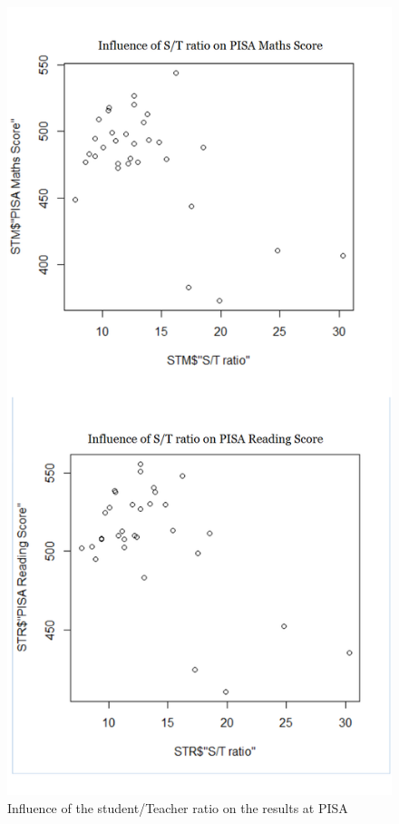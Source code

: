 \documentclass[12pt,a4paper]{article}
\begin{document}
\begin{figure}
	\centering
	\label{STRatio}
	\caption{Influence of the student/Teacher ratio on the results at PISA}
	\includegraphics[scale=0.4]{img/STRatio.png}
\end{figure}
\end{document}
